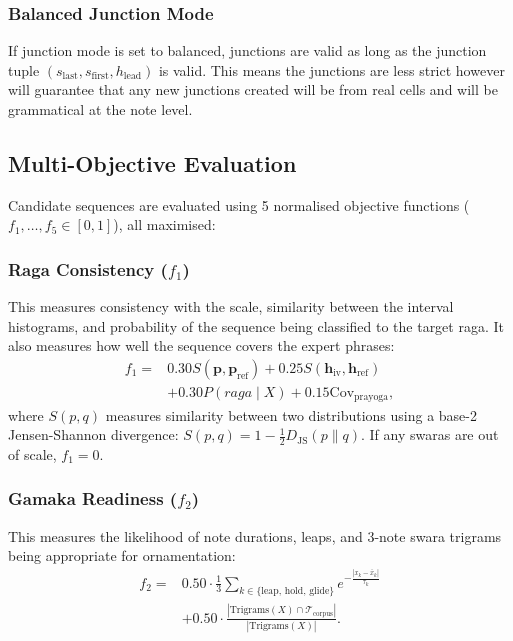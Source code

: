 \documentclass[conference,letterpaper]{IEEEtran}
\begin{document}
\subsubsection{Balanced Junction Mode}
If junction mode is set to balanced, junctions are valid as long as the junction tuple $(s_{\text{last}}, s_{\text{first}}, h_{\text{lead}})$ is valid. This means the junctions are less strict however will guarantee that any new junctions created will be from real cells and will be grammatical at the note level.

\subsection{Multi-Objective Evaluation}
Candidate sequences are evaluated using 5 normalised objective functions ($f_1, \dots, f_5 \in [0, 1]$), all maximised:

\subsubsection{Raga Consistency ($f_1$)}
This measures consistency with the scale, similarity between the interval histograms, and probability of the sequence being classified to the target raga. It also measures how well the sequence covers the expert phrases:
\begin{equation}
\begin{split}
 f_1 ={}& 0.30 S(\mathbf{p}, \mathbf{p}_{\text{ref}}) + 0.25 S(\mathbf{h}_{\text{iv}}, \mathbf{h}_{\text{ref}}) \\
       & + 0.30 P(raga \mid X) + 0.15 \text{Cov}_{\text{prayoga}},
\end{split}
\end{equation}
where $S(p, q)$ measures similarity between two distributions using a base-2 Jensen-Shannon divergence: $S(p, q) = 1 - \frac{1}{2} D_{\text{JS}}(p \parallel q)$. If any swaras are out of scale, $f_1 = 0$.

\subsubsection{Gamaka Readiness ($f_2$)}
This measures the likelihood of note durations, leaps, and 3-note swara trigrams being appropriate for ornamentation:
\begin{equation}
\begin{split}
 f_2 ={}& 0.50 \cdot \frac{1}{3} \sum_{k \in \{\text{leap, hold, glide}\}} e^{-\frac{|x_k - \bar{x}_k|}{\tau_k}} \\
       & + 0.50 \cdot \frac{|\text{Trigrams}(X) \cap \mathcal{T}_{\text{corpus}}|}{|\text{Trigrams}(X)|}.
\end{split}
\end{equation}
\end{document}
